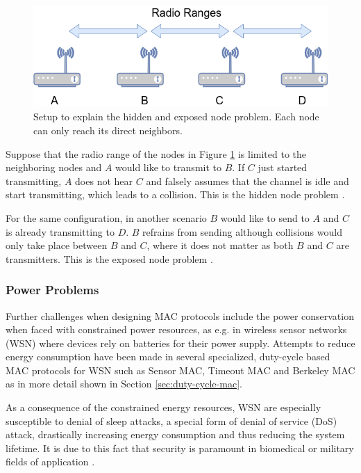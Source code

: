 \begin{figure}[tb]
	\label{fig:hidden_exposed_node_problem}
	\begin{center}
		\includegraphics[width=12cm]{pictures/hidden_exposed_node_problem}
	\end{center}
	\caption[Setup to explain the hidden and exposed node problem.]{Setup to explain the hidden and exposed node problem. Each node can only reach its direct neighbors.}
\end{figure}

Suppose that the radio range of the nodes in Figure \ref{fig:hidden_exposed_node_problem} is limited to the neighboring nodes and $A$ would like to transmit to $B$. If $C$ just started transmitting, $A$ does not hear $C$ and falsely assumes that the channel is idle and start transmitting, which leads to a collision. This is the hidden node problem \cite{Tanenbaum02}\cite{Gast05}.

For the same configuration, in another scenario $B$ would like to send to $A$ and $C$ is already transmitting to $D$. $B$ refrains from sending although collisions would only take place between $B$ and $C$, where it does not matter as both $B$ and $C$ are transmitters. This is the exposed node problem \cite{Tanenbaum02}\cite{Gast05} . 

\subsubsection{Power Problems}

Further challenges when designing MAC protocols include the power conservation when faced with constrained power resources, as e.g. in wireless sensor networks (WSN) where devices rely on batteries for their power supply. Attempts to reduce energy consumption have been made in several specialized, duty-cycle based MAC protocols for WSN such as Sensor MAC, Timeout MAC and Berkeley MAC as in more detail shown in Section \ref{sec:duty-cycle-mac}.

As a consequence of the constrained energy resources, WSN are especially susceptible to denial of sleep attacks, a special form of denial of service (DoS) attack, drastically increasing energy consumption and thus reducing the system lifetime. It is due to this fact that security is paramount in biomedical or military fields of application \cite{raymond09}. 


